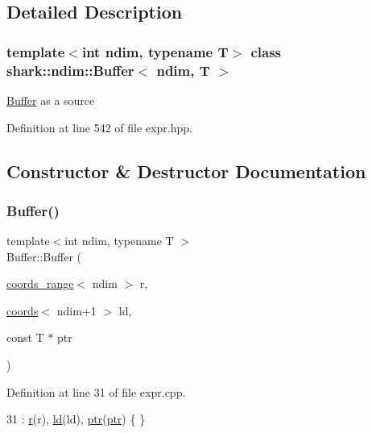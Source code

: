 \subsection{Detailed Description}
\subsubsection*{template$<$int ndim, typename T$>$\newline
class shark\+::ndim\+::\+Buffer$<$ ndim, T $>$}

\hyperlink{classshark_1_1ndim_1_1_buffer}{Buffer} as a source 

Definition at line 542 of file expr.\+hpp.



\subsection{Constructor \& Destructor Documentation}
\hypertarget{classshark_1_1ndim_1_1_buffer_a835dbc113d95b290cd274d9895280e1f}{}\label{classshark_1_1ndim_1_1_buffer_a835dbc113d95b290cd274d9895280e1f} 
\subsubsection{\texorpdfstring{Buffer()}{Buffer()}}
{\footnotesize\ttfamily template$<$int ndim, typename T $>$ \\
Buffer\+::\+Buffer (\begin{DoxyParamCaption}\item[{\hyperlink{structshark_1_1ndim_1_1coords__range}{coords\+\_\+range}$<$ ndim $>$}]{r,  }\item[{\hyperlink{structshark_1_1ndim_1_1coords}{coords}$<$ ndim+1 $>$}]{ld,  }\item[{const T $\ast$}]{ptr }\end{DoxyParamCaption})}



Definition at line 31 of file expr.\+cpp.


\begin{DoxyCode}
31 : \hyperlink{classshark_1_1ndim_1_1_buffer_adf5e1304ce98553284cf98e88e6c24e0}{r}(r), \hyperlink{classshark_1_1ndim_1_1_buffer_aa17fcbd807223fcb3cc5f211c32253d1}{ld}(ld), \hyperlink{classshark_1_1ndim_1_1_buffer_a0a63bf45d2f93a9670d736ae5123331a}{ptr}(\hyperlink{classshark_1_1ndim_1_1_buffer_a0a63bf45d2f93a9670d736ae5123331a}{ptr}) \{ \}
\end{DoxyCode}
\hypertarget{classshark_1_1ndim_1_1_buffer_a59b8743e4a5f731bdd0c4185c9ef263b}{}\label{classshark_1_1ndim_1_1_buffer_a59b8743e4a5f731bdd0c4185c9ef263b} 
